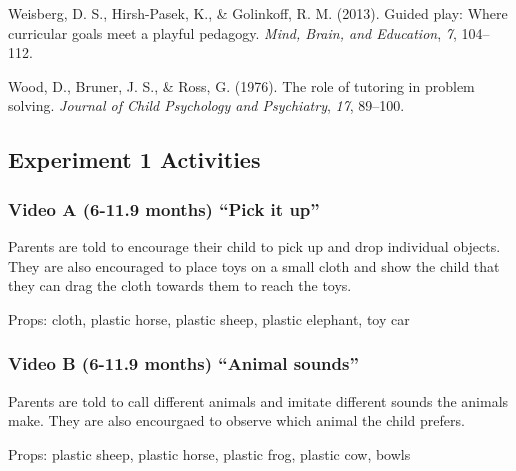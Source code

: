 \documentclass[man,floatsintext]{apa6}
\begin{document}
\leavevmode\hypertarget{ref-Weisberg2013}{}%
Weisberg, D. S., Hirsh-Pasek, K., \& Golinkoff, R. M. (2013). Guided play: Where curricular goals meet a playful pedagogy. \emph{Mind, Brain, and Education}, \emph{7}, 104--112.

\leavevmode\hypertarget{ref-Wood1976}{}%
Wood, D., Bruner, J. S., \& Ross, G. (1976). The role of tutoring in problem solving. \emph{Journal of Child Psychology and Psychiatry}, \emph{17}, 89--100.

\endgroup

\clearpage
\makeatletter
\efloat@restorefloats
\makeatother


\begin{appendix}
\section{}
\hypertarget{experiment-1-activities}{%
\subsection{Experiment 1 Activities}\label{experiment-1-activities}}

\hypertarget{video-a-6-11.9-months-pick-it-up}{%
\subsubsection{Video A (6-11.9 months) ``Pick it
up''}\label{video-a-6-11.9-months-pick-it-up}}

Parents are told to encourage their child to pick up and drop individual
objects. They are also encouraged to place toys on a small cloth and
show the child that they can drag the cloth towards them to reach the
toys.

Props: cloth, plastic horse, plastic sheep, plastic elephant, toy car

\hypertarget{video-b-6-11.9-months-animal-sounds}{%
\subsubsection{Video B (6-11.9 months) ``Animal
sounds''}\label{video-b-6-11.9-months-animal-sounds}}

Parents are told to call different animals and imitate different sounds
the animals make. They are also encourgaed to observe which animal the
child prefers.

Props: plastic sheep, plastic horse, plastic frog, plastic cow, bowls

\hypertarget{video-c-12-17.9-months-give-me-the-toy}{%
}
\end{appendix}
\end{document}

